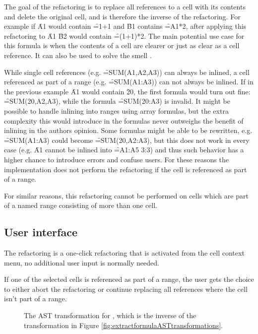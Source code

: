 The goal of the  refactoring is to replace all references to a cell with its contents and delete the original cell, and is therefore the inverse of the  refactoring.
For example if \f{A1} would contain \f{=1+1} and \f{B1} contains \f{=A1*2}, after applying this refactoring to \f{A1} \f{B2} would contain \f{=(1+1)*2}. 
The main potential use case for this formula is when the contents of a cell are clearer or just as clear as a cell reference.
It can also be used to solve the  smell \cite{hermans2014detecting}.

While single cell references (e.g. \f{=SUM(A1,A2,A3)}) can always be inlined, a cell referenced as part of a range (e.g. \f{=SUM(A1:A3)}) can not always be inlined.
If in the previous example \f{A1} would contain \f{20}, the first formula would turn out fine: \f{=SUM(20,A2,A3)}, while the formula \f{=SUM(20:A3)} is invalid.
It might be possible to handle inlining into ranges using array formulas, but the extra complexity this would introduce in the formulas never outweighs the benefit of inlining in the authors opinion.
Some formulas might be able to be rewritten, e.g. \f{=SUM(A1:A3)} could become \f{=SUM(20,A2:A3)}, but this does not work in every case (e.g. \f{A1} cannot be inlined into \f{=A1:A5 3:3}) and thus such behavior has a higher chance to introduce errors and confuse users.
For these reasons the implementation does not perform the refactoring if the cell is referenced as part of a range.

For similar reasons, this refactoring cannot be performed on cells which are part of a named range consisting of more than one cell.

\subsection{User interface}

The refactoring is a one-click refactoring that is activated from the cell context menu, no additional user input is normally needed.

If one of the selected cells is referenced as part of a range, the user gets the choice to either abort the refactoring or continue replacing all references where the cell isn't part of a range.

\begin{figure}
	\centering
	
	\caption{The AST transformation for , which is the inverse of the  transformation in Figure \ref{fig:extractformulaASTtransformations}.}
	\label{fig:inlineformulaAST}
\end{figure}

